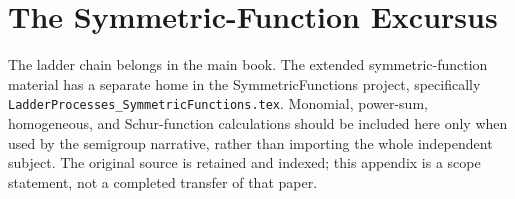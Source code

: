 \chapter{The Symmetric-Function Excursus}
The ladder chain belongs in the main book. The extended symmetric-function
material has a separate home in the SymmetricFunctions project, specifically
\texttt{LadderProcesses\_SymmetricFunctions.tex}. Monomial, power-sum,
homogeneous, and Schur-function calculations should be included here only
when used by the semigroup narrative, rather than importing the whole
independent subject. The original source is retained and indexed; this
appendix is a scope statement, not a completed transfer of that paper.
